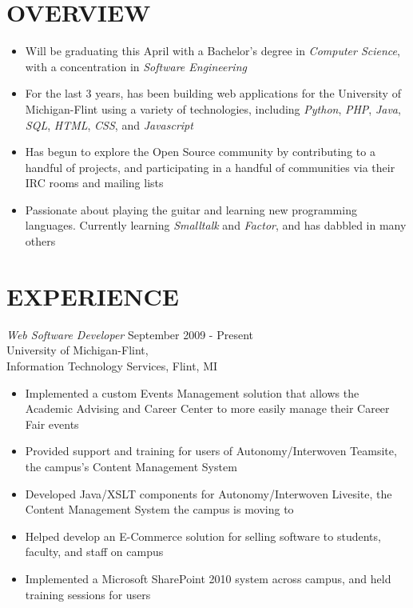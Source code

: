\documentclass[line,margin]{res}
\begin{document}

\address{1450 Schafer Drive, Burton, MI 48509}
\address{pwoolcoc@gmail.com\ -\ (810) 412-8642}


\begin{resume}


\section{OVERVIEW}
    \begin{itemize}
    \item Will be graduating this April with a Bachelor's degree in
{\sl Computer Science}, with a concentration in {\sl Software
    Engineering}
    \item For the last 3 years, has been building web applications
    for the University of Michigan-Flint using a variety of
    technologies, including {\sl Python}, {\sl PHP}, {\sl Java},
{\sl SQL}, {\sl HTML}, {\sl CSS}, and {\sl Javascript}
\item Has begun to explore the Open Source community by contributing to
a handful of projects, and participating in a handful
of communities via their IRC rooms and mailing lists
\item Passionate about playing the guitar and learning new programming
languages. Currently learning {\sl Smalltalk} and {\sl Factor},
    and has dabbled in many others
    \end{itemize}


    \section{EXPERIENCE} {\sl Web Software Developer } \hfill September 2009 - Present \\
        University of Michigan-Flint, \\
        Information Technology Services, Flint, MI
        \vspace{2 mm}
        \begin{itemize}
        \item Implemented a custom Events Management solution that
        allows the Academic Advising and Career Center to
        more easily manage their Career Fair events
        \item Provided support and training for users of Autonomy/Interwoven
        Teamsite, the campus's Content Management System
        \item Developed Java/XSLT components for Autonomy/Interwoven Livesite, the
        Content Management System the campus is moving to
        \item Helped develop an E-Commerce solution for selling software
        to students, faculty, and staff on campus
        \item Implemented a Microsoft SharePoint 2010 system across
        campus, and held training sessions for users \\
            \end{itemize}


\end{resume}
\end{document}
